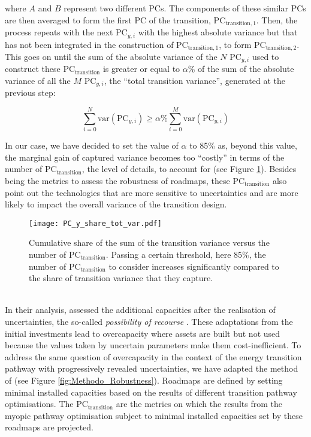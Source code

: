 \noindent
where $A$ and $B$ represent two different PCs.  The components of these similar PCs are then averaged to form the first PC of the transition, $\text{PC}_{\text{transition},1}$. Then, the process repeats with the next $\text{PC}_{y,i}$ with the highest absolute variance but that has not been integrated in the construction of $\text{PC}_{\text{transition},1}$, to form $\text{PC}_{\text{transition},2}$. This goes on until the sum of the absolute variance of the $N$ $\text{PC}_{y,i}$ used to construct these $\text{PC}_{\text{transition}}$ is greater or equal to $\alpha$\% of the sum of the absolute variance of all the $M$ $\text{PC}_{y,i}$, \ie the ``total transition variance'', generated at the previous step:

\begin{equation}
\label{eq:PC_transition}
\sum_{i=0}^N\text{var}\left(\text{PC}_{y,i}\right)\geq \alpha\% \sum_{i=0}^M\text{var}\left(\text{PC}_{y,i}\right)
\end{equation}

In our case, we have decided to set the value of $\alpha$ to 85\% as, beyond this value, the marginal gain of captured variance becomes too ``costly'' in terms of the number of $\text{PC}_{\text{transition}}$, \ie the level of details, to account for (see Figure \ref{fig:PC_y_share_tot_var}).  Besides being the metrics to assess the robustness of roadmaps, these $\text{PC}_{\text{transition}}$ also point out the technologies that are more sensitive to uncertainties and are more likely to impact the overall variance of the transition design.

\begin{figure}[!htbp]
\centering
\texttt{[image: PC\_y\_share\_tot\_var.pdf]}
\caption{Cumulative share of the sum of the transition variance versus the number of $\text{PC}_{\text{transition}}$. Passing a certain threshold, here 85\%, the number of $\text{PC}_{\text{transition}}$ to consider increases significantly compared to the share of transition variance that they capture.}
\label{fig:PC_y_share_tot_var}
\end{figure}

\\

\noindent
In their analysis, \citet{moret2020overcapacity} assessed the additional capacities after the realisation of uncertainties, the so-called \textit{possibility of recourse} \cite{grossmann2016recent}. These adaptations from the initial investments lead to overcapacity where assets are built but not used because the values taken by uncertain parameters make them cost-inefficient. To address the same question of overcapacity in the context of the energy transition pathway with progressively revealed uncertainties, we have adapted the method of \citet{moret2020overcapacity} (see Figure \ref{fig:Methodo_Robustness}). Roadmaps are defined by setting minimal installed capacities based on the results of different transition pathway optimisations. The $\text{PC}_{\text{transition}}$ are the metrics on which the results from the myopic pathway optimisation subject to minimal installed capacities set by these roadmaps are projected. 

